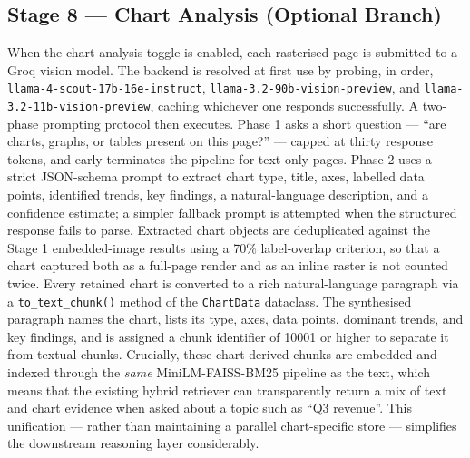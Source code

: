 \documentclass[conference]{IEEEtran}
\begin{document}
\subsection{Stage 8 --- Chart Analysis (Optional Branch)}
When the chart-analysis toggle is enabled, each rasterised page is submitted to a Groq vision model. The backend is resolved at first use by probing, in order, \texttt{llama-4-scout-17b-16e-instruct}, \texttt{llama-3.2-90b-vision-preview}, and \texttt{llama-3.2-11b-vision-preview}, caching whichever one responds successfully. A two-phase prompting protocol then executes. Phase 1 asks a short question --- ``are charts, graphs, or tables present on this page?'' --- capped at thirty response tokens, and early-terminates the pipeline for text-only pages. Phase 2 uses a strict JSON-schema prompt to extract chart type, title, axes, labelled data points, identified trends, key findings, a natural-language description, and a confidence estimate; a simpler fallback prompt is attempted when the structured response fails to parse. Extracted chart objects are deduplicated against the Stage 1 embedded-image results using a 70\% label-overlap criterion, so that a chart captured both as a full-page render and as an inline raster is not counted twice.
Every retained chart is converted to a rich natural-language paragraph via a \texttt{to\_text\_chunk()} method of the \texttt{ChartData} dataclass. The synthesised paragraph names the chart, lists its type, axes, data points, dominant trends, and key findings, and is assigned a chunk identifier of 10001 or higher to separate it from textual chunks. Crucially, these chart-derived chunks are embedded and indexed through the \emph{same} MiniLM-FAISS-BM25 pipeline as the text, which means that the existing hybrid retriever can transparently return a mix of text and chart evidence when asked about a topic such as ``Q3 revenue''. This unification --- rather than maintaining a parallel chart-specific store --- simplifies the downstream reasoning layer considerably.
\end{document}
